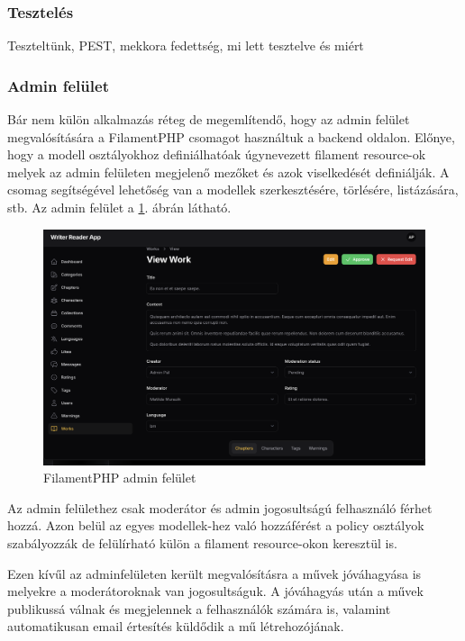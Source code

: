 \subsubsection{Tesztelés}

Teszteltünk, PEST, mekkora fedettség, mi lett tesztelve és miért

\subsubsection{Admin felület}

Bár nem külön alkalmazás réteg de megemlítendő, hogy az admin felület megvalósítására a FilamentPHP csomagot \cite{FilamentPHP} használtuk a backend oldalon. Előnye, hogy a modell osztályokhoz definiálhatóak úgynevezett filament resource-ok melyek az admin felületen megjelenő mezőket és azok viselkedését definiálják. A csomag segítségével lehetőség van a modellek szerkesztésére, törlésére, listázására, stb. Az admin felület a \ref{fig:admin}. ábrán látható.

\begin{figure}[H]
    \centering
    \includegraphics[scale=0.25]{./figures/admin-panel.png}
    \caption{FilamentPHP admin felület}
    \label{fig:admin}
\end{figure}

Az admin felülethez csak moderátor és admin jogosultságú felhasználó férhet hozzá. Azon belül az egyes modellek-hez való hozzáférést a policy osztályok szabályozzák de felülírható külön a filament resource-okon keresztül is.

Ezen kívűl az adminfelületen került megvalósításra a művek jóváhagyása is melyekre a moderátoroknak van jogosultságuk. A jóváhagyás után a művek publikussá válnak és megjelennek a felhasználók számára is, valamint automatikusan email értesítés küldődik a mű létrehozójának.